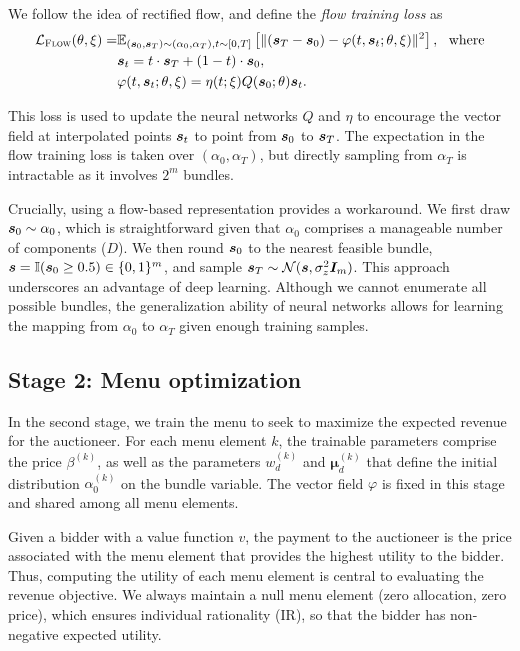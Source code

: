 We  follow the idea of  rectified flow, and define the {\em flow training loss} as
%
\begin{align}
    \mathcal{L}_{\textsc{Flow}}(\theta,\xi) =& \mathbb{E}_{({\bm{s}}_0,{\bm{s}}_T)\sim (\alpha_0,\alpha_T), t\sim [0,T]} \left[\|({\bm{s}}_T-{\bm{s}}_0)-\varphi(t, {\bm{s}}_t; \theta,\xi)\|^2\right], \label{equ:flow_loss}\ \ \mbox{where}\\
    & {\bm{s}}_t = t\cdot {\bm{s}}_T + (1-t)\cdot {\bm{s}}_0,\\
    & \varphi(t, {\bm{s}}_t; \theta,\xi)=\eta(t;\xi)Q({\bm{s}}_0;\theta){\bm{s}}_t.
\end{align}

This loss is used to update the neural networks $Q$ and $\eta$ to encourage the vector field at interpolated points ${\bm{s}}_t$ to point from ${\bm{s}}_0$ to ${\bm{s}}_T$.
%
The expectation in the flow training loss is taken over $(\alpha_0,\alpha_T)$, 
but directly sampling from $\alpha_T$ is intractable as it involves $2^m$ bundles.

Crucially, using a flow-based representation provides a workaround. We first draw ${\bm{s}}_0\sim \alpha_0$, which is straightforward given that $\alpha_0$ comprises a manageable number of components ($D$). We then round ${\bm{s}}_0$ to
the nearest feasible bundle, ${\bm{s}}=\mathbb{I}({\bm{s}}_0\ge 0.5)\in\{0,1\}^m$,
and sample ${\bm{s}}_T\sim \mathcal{N}({\bm{s}}, \sigma_z^2{\bm{I}}_m)$. This approach underscores an advantage of deep learning. Although we cannot enumerate all possible bundles, the generalization ability of neural networks allows for learning the mapping from $\alpha_0$ to $\alpha_T$ given enough training samples.


\subsection{Stage 2: Menu optimization}\label{sec:method:opt}

In the second stage, we train the menu to seek to maximize the expected revenue for the auctioneer. For each menu element $k$,  the 
trainable parameters comprise the price $\beta^{(k)}$, as well as the parameters $w_d^{(k)}$ and $\bm\mu_d^{(k)}$ that define the initial distribution $\alpha^{(k)}_0$ on the bundle variable. 
The vector field $\varphi$ is  fixed in this stage and shared
among all menu elements.

Given a bidder with a value function $v$, the payment to the auctioneer is the price associated with the menu element that provides the highest utility to the bidder. 
Thus, computing the utility of each menu element is central to evaluating the revenue objective.
We always maintain a null menu element (zero allocation, zero price), which ensures 
  individual rationality (IR), so that the bidder has  non-negative expected
utility. 

